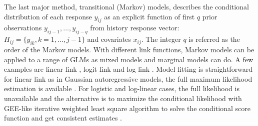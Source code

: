 \documentclass[12pt]{article}
\begin{document}
The last major method, transitional (Markov) models, describes the conditional distribution of each response $y_{ij}$ as an explicit function of first $q$ prior observations $y_{ij-1},\dots,y_{ij-q}$ from history response vector: $H_{ij} = \{ y_{ik}, k = 1,\dots,j - 1\}$ and covariates $x_{ij}$. The integer $q$ is referred as the order of the Markov models. With different link functions, Markov models can be applied to a range of GLMs as mixed models and marginal models can do. A few examples are linear link \cite{tsay1984regression}, logit link \cite{cox1989analysis,zeger1985analysis,korn1979methods} and log link \cite{zeger1988markov}. Model fitting is straightforward for linear link as in Gaussian autoregressive models, the full maximum likelihood estimation is available \cite{tsay1984regression}. For logistic and log-linear cases, the full likelihood is unavailable and the alternative is to maximize the conditional likelihood with GEE-like iterative weighted least square algorithm to solve the conditional score function and get consistent estimates \cite{cox1989analysis,zeger1985analysis,korn1979methods,zeger1988markov}.
\end{document}
